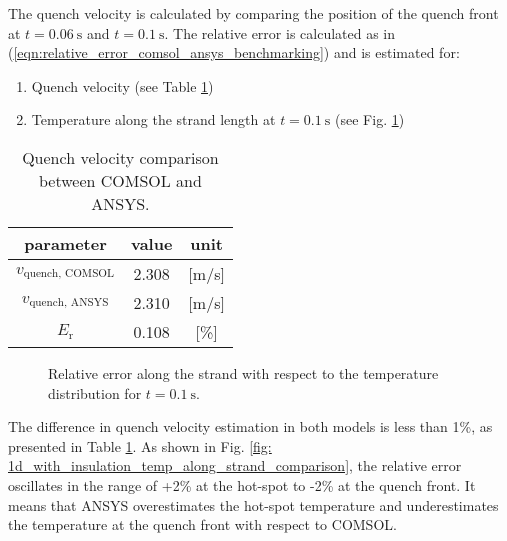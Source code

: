 The quench velocity is calculated by comparing the position of the quench front at $t=0.06~\text{s}$ and $t=0.1~\text{s}$. The relative error is calculated as in (\ref{eqn:relative_error_comsol_ansys_benchmarking}) and is estimated for: 
\begin{enumerate}
    \item Quench velocity (see Table \ref{table: 1d_with_insulation_v_quench_comparison})
    \item Temperature along the strand length at $t=0.1~\text{s}$ (see Fig. \ref{fig: ans_comsol_comparison_f_2_2_with_insulation})
\end{enumerate}

\begin{table}[H]
    \caption{Quench velocity comparison between COMSOL and ANSYS.} 
    \vspace{-1.em} 
    \fontsize{10}{10}
    \selectfont 
    \renewcommand{\arraystretch}{1.5}
    \begin{center}
        \begin{tabular}{ ccc }  
        \hline
        parameter & value & unit \\
        \hline
        $v_\text{quench, COMSOL}$ & 2.308 & [m/s] \\
        $v_\text{quench, ANSYS}$ & 2.310 & [m/s] \\
        $E_\text{r}$ & 0.108 & [\%] \\
        \hline 
        \end{tabular}
    \end{center}  
     \label{table: 1d_with_insulation_v_quench_comparison} 
 \end{table}

\begin{figure}[H]
\centering
    \caption{Relative error along the strand with respect to the temperature distribution for $t=0.1~\text{s}$.}
    \label{fig: ans_comsol_comparison_f_2_2_with_insulation}
\end{figure}

The difference in quench velocity estimation in both models is less than 1\%, as presented in Table \ref{table: 1d_with_insulation_v_quench_comparison}. As shown in Fig. \ref{fig: 1d_with_insulation_temp_along_strand_comparison}, the relative error oscillates in the range of +2\% at the hot-spot to -2\% at the quench front. It means that ANSYS overestimates the hot-spot temperature and underestimates the temperature at the quench front with respect to COMSOL.


